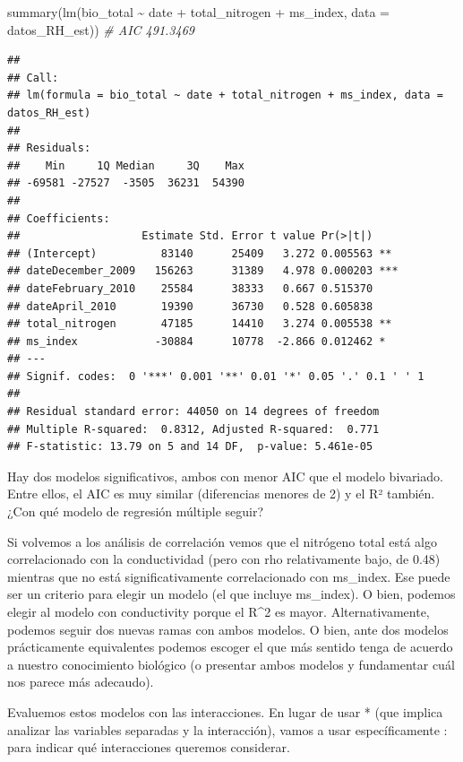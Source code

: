 \documentclass[
]{book}
\newenvironment{Shaded}{\begin{snugshade}}{\end{snugshade}}
\newcommand{\AttributeTok}[1]{\textcolor[rgb]{0.77,0.63,0.00}{#1}}
\newcommand{\CommentTok}[1]{\textcolor[rgb]{0.56,0.35,0.01}{\textit{#1}}}
\newcommand{\FunctionTok}[1]{\textcolor[rgb]{0.00,0.00,0.00}{#1}}
\newcommand{\NormalTok}[1]{#1}
\newcommand{\SpecialCharTok}[1]{\textcolor[rgb]{0.00,0.00,0.00}{#1}}
\begin{document}
\begin{Shaded}
\begin{Highlighting}[]
\FunctionTok{summary}\NormalTok{(}\FunctionTok{lm}\NormalTok{(bio\_total }\SpecialCharTok{\textasciitilde{}}\NormalTok{ date }\SpecialCharTok{+}\NormalTok{ total\_nitrogen }\SpecialCharTok{+}\NormalTok{ ms\_index, }\AttributeTok{data =}\NormalTok{ datos\_RH\_est)) }\CommentTok{\# AIC 491.3469}
\end{Highlighting}
\end{Shaded}

\begin{verbatim}
## 
## Call:
## lm(formula = bio_total ~ date + total_nitrogen + ms_index, data = datos_RH_est)
## 
## Residuals:
##    Min     1Q Median     3Q    Max 
## -69581 -27527  -3505  36231  54390 
## 
## Coefficients:
##                   Estimate Std. Error t value Pr(>|t|)    
## (Intercept)          83140      25409   3.272 0.005563 ** 
## dateDecember_2009   156263      31389   4.978 0.000203 ***
## dateFebruary_2010    25584      38333   0.667 0.515370    
## dateApril_2010       19390      36730   0.528 0.605838    
## total_nitrogen       47185      14410   3.274 0.005538 ** 
## ms_index            -30884      10778  -2.866 0.012462 *  
## ---
## Signif. codes:  0 '***' 0.001 '**' 0.01 '*' 0.05 '.' 0.1 ' ' 1
## 
## Residual standard error: 44050 on 14 degrees of freedom
## Multiple R-squared:  0.8312, Adjusted R-squared:  0.771 
## F-statistic: 13.79 on 5 and 14 DF,  p-value: 5.461e-05
\end{verbatim}

Hay dos modelos significativos, ambos con menor AIC que el modelo bivariado. Entre ellos, el AIC es muy similar (diferencias menores de 2) y el R² también. ¿Con qué modelo de regresión múltiple seguir?

Si volvemos a los análisis de correlación vemos que el nitrógeno total está algo correlacionado con la conductividad (pero con rho relativamente bajo, de 0.48) mientras que no está significativamente correlacionado con ms\_index. Ese puede ser un criterio para elegir un modelo (el que incluye ms\_index). O bien, podemos elegir al modelo con conductivity porque el R\^{}2 es mayor. Alternativamente, podemos seguir dos nuevas ramas con ambos modelos. O bien, ante dos modelos prácticamente equivalentes podemos escoger el que más sentido tenga de acuerdo a nuestro conocimiento biológico (o presentar ambos modelos y fundamentar cuál nos parece más adecaudo).

Evaluemos estos modelos con las interacciones. En lugar de usar * (que implica analizar las variables separadas y la interacción), vamos a usar específicamente : para indicar qué interacciones queremos considerar.
\end{document}
